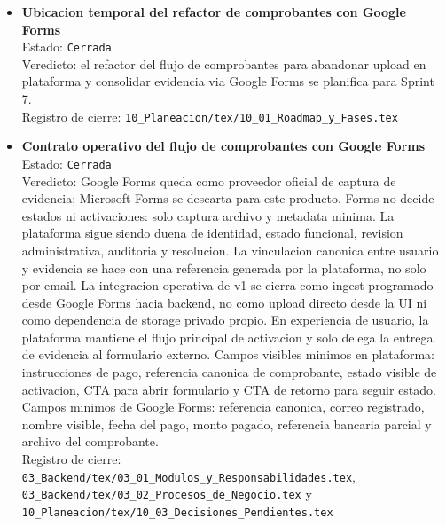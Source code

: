 \begin{itemize}
  \item \textbf{Ubicacion temporal del refactor de comprobantes con Google Forms}\\
  Estado: \texttt{Cerrada}\\
  Veredicto: el refactor del flujo de comprobantes para abandonar upload en plataforma y consolidar evidencia via Google Forms se planifica para Sprint 7.\\
  Registro de cierre: \texttt{10\_Planeacion/tex/10\_01\_Roadmap\_y\_Fases.tex}

  \item \textbf{Contrato operativo del flujo de comprobantes con Google Forms}\\
  Estado: \texttt{Cerrada}\\
  Veredicto: Google Forms queda como proveedor oficial de captura de evidencia; Microsoft Forms se descarta para este producto. Forms no decide estados ni activaciones: solo captura archivo y metadata minima. La plataforma sigue siendo duena de identidad, estado funcional, revision administrativa, auditoria y resolucion. La vinculacion canonica entre usuario y evidencia se hace con una referencia generada por la plataforma, no solo por email. La integracion operativa de v1 se cierra como ingest programado desde Google Forms hacia backend, no como upload directo desde la UI ni como dependencia de storage privado propio. En experiencia de usuario, la plataforma mantiene el flujo principal de activacion y solo delega la entrega de evidencia al formulario externo. Campos visibles minimos en plataforma: instrucciones de pago, referencia canonica de comprobante, estado visible de activacion, CTA para abrir formulario y CTA de retorno para seguir estado. Campos minimos de Google Forms: referencia canonica, correo registrado, nombre visible, fecha del pago, monto pagado, referencia bancaria parcial y archivo del comprobante.\\
  Registro de cierre: \texttt{03\_Backend/tex/03\_01\_Modulos\_y\_Responsabilidades.tex}, \texttt{03\_Backend/tex/03\_02\_Procesos\_de\_Negocio.tex} y \texttt{10\_Planeacion/tex/10\_03\_Decisiones\_Pendientes.tex}


\end{itemize}
